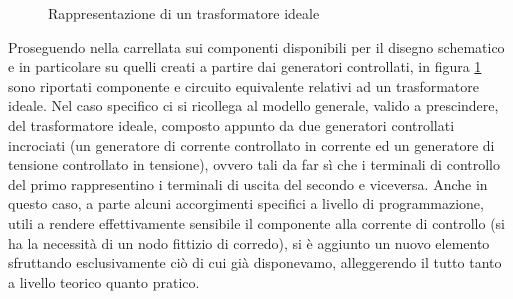 \begin{figure}
 \centering
 \hspace{50pt}
 \caption{Rappresentazione di un trasformatore ideale}
 \label{fig:trans}
\end{figure}

Proseguendo nella carrellata sui componenti disponibili per il disegno schematico e in particolare su quelli creati a partire dai generatori controllati, in figura \ref{fig:trans} sono riportati componente e circuito equivalente relativi ad un trasformatore ideale. Nel caso specifico ci si ricollega al modello generale, valido a prescindere, del trasformatore ideale, composto appunto da due generatori controllati incrociati (un generatore di corrente controllato in corrente ed un generatore di tensione controllato in tensione), ovvero tali da far sì che i terminali di controllo del primo rappresentino i terminali di uscita del secondo e viceversa. Anche in questo caso, a parte alcuni accorgimenti specifici a livello di programmazione, utili a rendere effettivamente sensibile il componente alla corrente di controllo (si ha la necessità di un nodo fittizio di corredo), si è aggiunto un nuovo elemento sfruttando esclusivamente ciò di cui già disponevamo, alleggerendo il tutto tanto a livello teorico quanto pratico.

